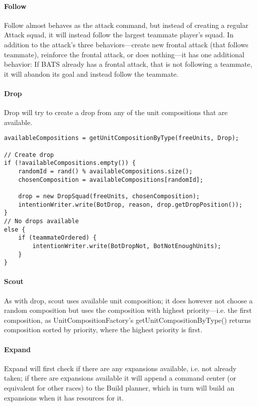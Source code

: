 \paragraph{Follow}
Follow almost behaves as the attack command, but instead of creating a regular Attack squad, it will instead follow the largest teammate player’s squad. In addition to the attack’s three behaviors—create new frontal attack (that follows teammate), reinforce the frontal attack, or does nothing—it has one additional behavior: If BATS already has a frontal attack, that is not following a teammate, it will abandon its goal and instead follow the teammate.

\paragraph{Drop}
Drop will try to create a drop from any of the unit compositions that are available.
\begin{lstlisting}[label={lst:order_drop},caption={Pseudo-code for the drop command}]
availableCompositions = getUnitCompositionByType(freeUnits, Drop);

// Create drop
if (!availableCompositions.empty()) {
	randomId = rand() % availableCompositions.size();
	chosenComposition = availableCompositions[randomId];

	drop = new DropSquad(freeUnits, chosenComposition);
	intentionWriter.write(BotDrop, reason, drop.getDropPosition());
}
// No drops available
else {
	if (teammateOrdered) {
		intentionWriter.write(BotDropNot, BotNotEnoughUnits);
	}
}
\end{lstlisting}

\paragraph{Scout}
As with drop, scout uses available unit composition; it does however not choose a random composition but uses the composition with highest priority—i.e. the first composition, as UnitCompositionFactory’s getUnitCompositionByType() returns composition sorted by priority, where the highest priority is first.

\paragraph{Expand}
Expand will first check if there are any expansions available, i.e. not already taken; if there are expansions available it will append a command center (or equivalent for other races) to the Build planner, which in turn will build an expansions when it has resources for it.

